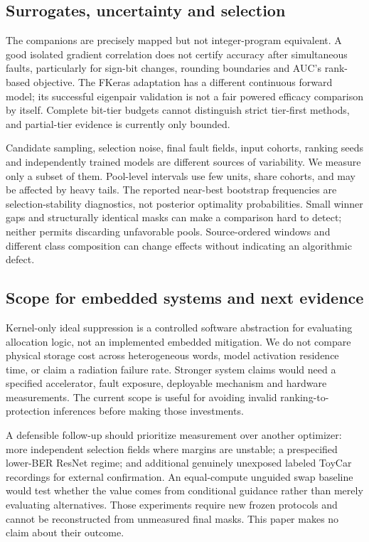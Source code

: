 \subsection{Surrogates, uncertainty and selection}
The companions are precisely mapped but not integer-program equivalent. A good isolated gradient correlation does not certify accuracy after simultaneous faults, particularly for sign-bit changes, rounding boundaries and AUC's rank-based objective. The FKeras adaptation has a different continuous forward model; its successful eigenpair validation is not a fair powered efficacy comparison by itself. Complete bit-tier budgets cannot distinguish strict tier-first methods, and partial-tier evidence is currently only bounded.

Candidate sampling, selection noise, final fault fields, input cohorts, ranking seeds and independently trained models are different sources of variability. We measure only a subset of them. Pool-level intervals use few units, share cohorts, and may be affected by heavy tails. The reported near-best bootstrap frequencies are selection-stability diagnostics, not posterior optimality probabilities. Small winner gaps and structurally identical masks can make a comparison hard to detect; neither permits discarding unfavorable pools. Source-ordered windows and different class composition can change effects without indicating an algorithmic defect.

\subsection{Scope for embedded systems and next evidence}
Kernel-only ideal suppression is a controlled software abstraction for evaluating allocation logic, not an implemented embedded mitigation. We do not compare physical storage cost across heterogeneous words, model activation residence time, or claim a radiation failure rate. Stronger system claims would need a specified accelerator, fault exposure, deployable mechanism and hardware measurements. The current scope is useful for avoiding invalid ranking-to-protection inferences before making those investments.

A defensible follow-up should prioritize measurement over another optimizer: more independent selection fields where margins are unstable; a prespecified lower-BER ResNet regime; and additional genuinely unexposed labeled ToyCar recordings for external confirmation. An equal-compute unguided swap baseline would test whether the value comes from conditional guidance rather than merely evaluating alternatives. Those experiments require new frozen protocols and cannot be reconstructed from unmeasured final masks. This paper makes no claim about their outcome.

